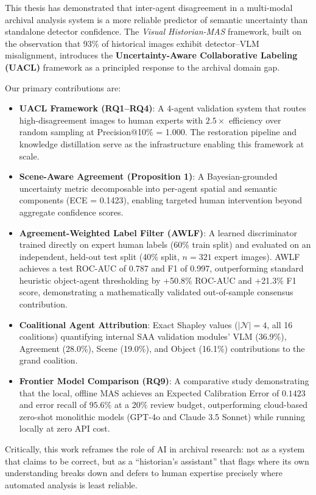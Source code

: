 \documentclass[12pt,onecolumn,a4paper]{IEEEtran}
\begin{document}
This thesis has demonstrated that inter-agent disagreement in a multi-modal archival analysis system is a more reliable predictor of semantic uncertainty than standalone detector confidence. The \textit{Visual Historian-MAS} framework, built on the observation that 93\% of historical images exhibit detector--VLM misalignment, introduces the \textbf{Uncertainty-Aware Collaborative Labeling (UACL)} framework as a principled response to the archival domain gap.

Our primary contributions are:
\begin{itemize}
    \item \textbf{UACL Framework (RQ1--RQ4)}: A 4-agent validation system that routes high-disagreement images to human experts with $2.5\times$ efficiency over random sampling at Precision@10\% = 1.000. The restoration pipeline and knowledge distillation serve as the infrastructure enabling this framework at scale.
    \item \textbf{Scene-Aware Agreement (Proposition 1)}: A Bayesian-grounded uncertainty metric decomposable into per-agent spatial and semantic components (ECE = 0.1423), enabling targeted human intervention beyond aggregate confidence scores.
    \item \textbf{Agreement-Weighted Label Filter (AWLF)}: A learned discriminator trained directly on expert human labels (60\% train split) and evaluated on an independent, held-out test split (40\% split, $n=321$ expert images). AWLF achieves a test ROC-AUC of 0.787 and F1 of 0.997, outperforming standard heuristic object-agent thresholding by +50.8\% ROC-AUC and +21.3\% F1 score, demonstrating a mathematically validated out-of-sample consensus contribution.
    \item \textbf{Coalitional Agent Attribution}: Exact Shapley values ($|\mathcal{N}|=4$, all 16 coalitions) quantifying internal SAA validation modules' VLM (36.9\%), Agreement (28.0\%), Scene (19.0\%), and Object (16.1\%) contributions to the grand coalition.
    \item \textbf{Frontier Model Comparison (RQ9)}: A comparative study demonstrating that the local, offline MAS achieves an Expected Calibration Error of $0.1423$ and error recall of $95.6\%$ at a 20\% review budget, outperforming cloud-based zero-shot monolithic models (GPT-4o and Claude 3.5 Sonnet) while running locally at zero API cost.
\end{itemize}

Critically, this work reframes the role of AI in archival research: not as a system that claims to be correct, but as a ``historian's assistant'' that flags where its own understanding breaks down and defers to human expertise precisely where automated analysis is least reliable.
\end{document}
